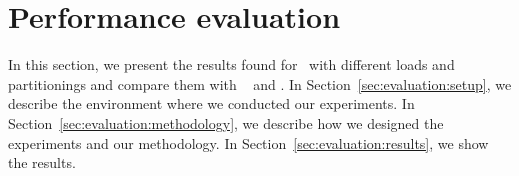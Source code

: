 \section{Performance evaluation}
\label{sec:experiments}

In this section, we present the results found for \appname\ with different loads and partitionings and compare them with
\ssmr{}~\cite{bezerra2014ssmr} and \dssmr.
In Section~\ref{sec:evaluation:setup}, we describe the environment where we conducted our experiments.
In Section~\ref{sec:evaluation:methodology}, we describe how we designed the experiments and our methodology.
In Section~\ref{sec:evaluation:results}, we show the results.


